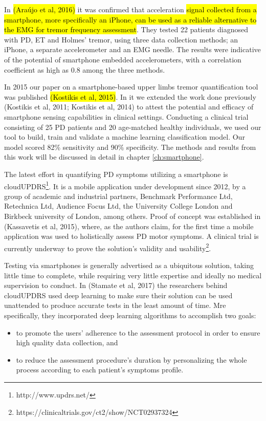 In \hl{(Araújo et al, 2016)} it was confirmed that acceleration \hl{signal collected from a smartphone, more specifically an iPhone, can be used as a reliable alternative to the EMG for tremor frequency assessment}. They tested 22 patients diagnosed with \gls{PD}, \gls{ET} and Holmes' tremor, using three data collection methods; an iPhone, a separate accelerometer and an \gls{EMG} needle. The results were indicative of the potential of smartphone embedded accelerometers, with a correlation coefficient as high as 0.8 among the three methods. 

In 2015 our paper on a smartphone-based upper limbs tremor quantification tool was published \hl{(Kostikis et al, 2015)}. In it we extended the work done previously (Kostikis et al, 2011; Kostikis et al, 2014) to attest the potential and efficacy of smartphone sensing capabilities in clinical settings. Conducting a clinical trial consisting of 25 \gls{PD} patients and 20 age-matched healthy individuals, we used our tool to build, train and validate a machine learning classification model. Our model scored 82\% sensitivity and 90\% specificity. The methods and results from this work will be discussed in detail in chapter \ref{ch:smartphone}. 

The latest effort in quantifying \gls{PD} symptoms utilizing a smartphone is cloudUPDRS\footnote{http://www.updrs.net/}. It is a mobile application under development since 2012, by a group of academic and industrial partners, Benchmark Performance Ltd, Retechnica Ltd, Audience Focus Ltd, the University College London and Birkbeck university of London, among others. Proof of concept was established in (Kassavetis et al, 2015), where, as the authors claim, for the first time a mobile application was used to holistically assess \gls{PD} motor symptoms. A clinical trial is currently underway to prove the solution's validity and usability\footnote{https://clinicaltrials.gov/ct2/show/NCT02937324}. 

Testing via smartphones is generally advertised as a ubiquitous solution, taking little time to complete, while requiring very little expertise and ideally no medical supervision to conduct. 
In (Stamate et al, 2017) the researchers behind cloudUPDRS used deep learning to make sure their solution can be used unattended to produce accurate tests in the least amount of time. Mre specifically, they incorporated deep learning algorithms to accomplish two goals: 

\begin{itemize}
\item to promote the users' adherence to the assessment protocol in order to ensure high quality data collection, and
\item to reduce the assessment procedure's duration by personalizing the whole process according to each patient's symptoms profile. 
\end{itemize}

